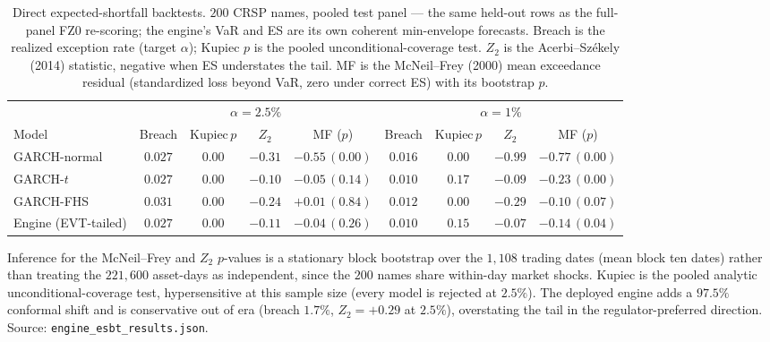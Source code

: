 \documentclass[11pt]{article}
\theoremstyle{remark}
\begin{document}
\begin{table}[t]
\centering
\begin{threeparttable}
\caption{Direct expected-shortfall backtests. $200$ CRSP names, pooled test
panel --- the same held-out rows as the full-panel FZ0 re-scoring; the engine's
VaR and ES are its own coherent min-envelope forecasts. Breach is the realized
exception rate (target $\alpha$); Kupiec $p$ is the pooled unconditional-coverage
test. $Z_2$ is the Acerbi--Sz\'ekely (2014) statistic, negative when ES
understates the tail. MF is the McNeil--Frey (2000) mean exceedance residual
(standardized loss beyond VaR, zero under correct ES) with its bootstrap $p$.}
\label{tab:esbt}
\small\setlength{\tabcolsep}{5pt}
\begin{tabular}{lcccc|cccc}
\toprule
 & \multicolumn{4}{c}{$\alpha=2.5\%$} & \multicolumn{4}{c}{$\alpha=1\%$}\\
\cmidrule(lr){2-5}\cmidrule(lr){6-9}
Model & Breach & Kupiec\,$p$ & $Z_2$ & MF ($p$) & Breach & Kupiec\,$p$ & $Z_2$ & MF ($p$) \\
\midrule
GARCH-normal & $0.027$ & $0.00$ & $-0.31$ & $-0.55\,(0.00)$ & $0.016$ & $0.00$ & $-0.99$ & $-0.77\,(0.00)$ \\
GARCH-$t$ & $0.027$ & $0.00$ & $\mathbf{-0.10}$ & $-0.05\,(0.14)$ & $0.010$ & $\mathbf{0.17}$ & $-0.09$ & $-0.23\,(0.00)$ \\
GARCH-FHS & $0.031$ & $0.00$ & $-0.24$ & $\mathbf{+0.01\,(0.84)}$ & $0.012$ & $0.00$ & $-0.29$ & $\mathbf{-0.10\,(0.07)}$ \\
Engine (EVT-tailed) & $0.027$ & $0.00$ & $-0.11$ & $-0.04\,(0.26)$ & $0.010$ & $\mathbf{0.15}$ & $\mathbf{-0.07}$ & $-0.14\,(0.04)$ \\
\bottomrule
\end{tabular}
\begin{tablenotes}\footnotesize
\item Inference for the McNeil--Frey and $Z_2$ $p$-values is a stationary block
bootstrap over the $1{,}108$ trading dates (mean block ten dates) rather than
treating the $221{,}600$ asset-days as independent, since the $200$ names share
within-day market shocks. Kupiec is the pooled analytic unconditional-coverage
test, hypersensitive at this sample size (every model is rejected at $2.5\%$).
The deployed engine adds a $97.5\%$ conformal shift and is conservative out of
era (breach $1.7\%$, $Z_2=+0.29$ at $2.5\%$), overstating the tail in the
regulator-preferred direction. Source: \texttt{engine\_esbt\_results.json}.
\end{tablenotes}
\end{threeparttable}
\end{table}
\end{document}
